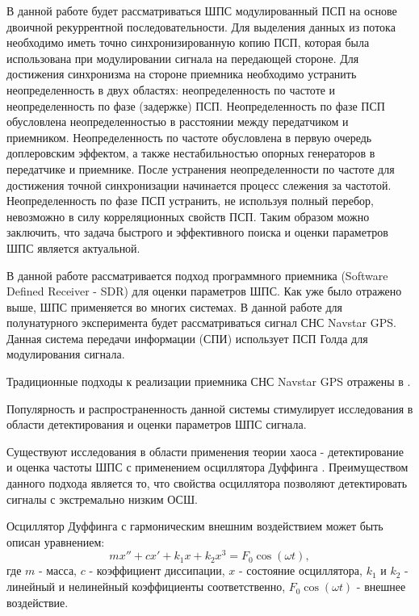 В данной работе будет рассматриваться ШПС модулированный ПСП на основе двоичной рекуррентной последовательности.
Для выделения данных из потока необходимо иметь точно синхронизированную копию ПСП, которая была использована
при модулировании сигнала на передающей стороне. Для достижения синхронизма на стороне приемника необходимо
устранить неопределенность в двух областях: неопределенность по частоте и неопределенность по фазе (задержке) ПСП.
Неопределенность по фазе ПСП обусловлена неопределенностью в расстоянии между передатчиком и приемником. Неопределенность
по частоте обусловлена в первую очередь доплеровским эффектом, а также нестабильностью опорных генераторов в
передатчике и приемнике. После устранения неопределенности по частоте для достижения точной синхронизации
начинается процесс слежения за частотой. Неопределенность по фазе ПСП устранить, не используя полный перебор,
невозможно в силу корреляционных свойств ПСП. Таким образом можно заключить, что задача быстрого и эффективного
поиска и оценки параметров ШПС является актуальной.

В данной работе рассматривается подход программного приемника (Software Defined Receiver - SDR)
\cite{akos-book, grayver-book, pany-book} для оценки параметров ШПС. Как уже было отражено выше, ШПС применяется во
многих системах. В данной работе для полунатурного эксперимента будет рассматриваться сигнал СНС Navstar GPS. Данная система передачи 
информации (СПИ) использует ПСП Голда \cite{gold-ieee} для модулирования сигнала.

Традиционные подходы к реализации приемника СНС Navstar GPS отражены в \cite{akos-book, tsui}. 

Популярность и распространенность данной системы стимулирует исследования в области детектирования
и оценки параметров ШПС сигнала.

Существуют исследования в области применения теории хаоса - детектирование и оценка
частоты ШПС с применением осциллятора Дуффинга \cite{chaos_cambridge, chaos_chen, chaos_huang, chaos_wang}. Преимуществом
данного подхода является то, что свойства осциллятора позволяют детектировать сигналы с экстремально низким ОСШ.

Осциллятор Дуффинга с гармоническим внешним воздействием может быть описан уравнением:
\begin{equation}
	\label{eq:duffing}
	mx'' + cx' + k_{1}x + k_{2}x^3 = F_{0}\cos(\omega{t}),
\end{equation}
где $m$ - масса, $c$ - коэффициент диссипации, $x$ - состояние осциллятора, $k_1$ и $k_2$ - линейный и нелинейный коэффициенты соответственно,
$F_{0}\cos(\omega{t})$ - внешнее воздействие.


